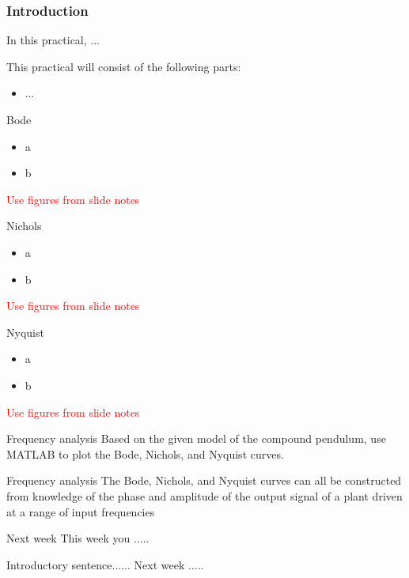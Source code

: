 \documentclass[9pt]{beamer-control}
\begin{document}

\begin{frame}
\frametitle{Introduction}
In this practical, ...

\vfill

This practical will consist of the following parts:
\begin{itemize}
\item ...
\end{itemize}
\end{frame}


\begin{frame}{Bode}
\begin{itemize}
\item a
\item b
\end{itemize}
\textcolor{red}{Use figures from slide notes}
\end{frame}

\begin{frame}{Nichols}
	\begin{itemize}
		\item a
		\item b
	\end{itemize}
\textcolor{red}{Use figures from slide notes}
\end{frame}

\begin{frame}{Nyquist}
	\begin{itemize}
		\item a
		\item b
	\end{itemize}
\textcolor{red}{Use figures from slide notes}
\end{frame}


\begin{frame}{Frequency analysis}
Based on the given model of the compound pendulum, use MATLAB to plot the Bode, Nichols, and Nyquist curves.
\end{frame}


\begin{frame}{Frequency analysis}
The Bode, Nichols, and Nyquist curves can all be constructed from knowledge of the phase and amplitude of the output signal of a plant driven at a range of input frequencies

\end{frame}


\begin{frame}{Next week}
	This week you .....
	
	Introductory sentence...... Next week ..... 
\end{frame}
\end{document}
